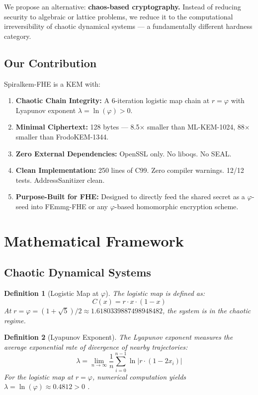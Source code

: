 \documentclass{article}
\newtheorem{definition}{Definition}[section]
\begin{document}
We propose an alternative: \textbf{chaos-based cryptography.} Instead of reducing security to algebraic or lattice problems, we reduce it to the computational irreversibility of chaotic dynamical systems — a fundamentally different hardness category.

\subsection{Our Contribution}

Spiralkem-FHE is a KEM with:
\begin{enumerate}
    \item \textbf{Chaotic Chain Integrity:} A 6-iteration logistic map chain at $r = \varphi$ with Lyapunov exponent $\lambda = \ln(\varphi) > 0$.
    \item \textbf{Minimal Ciphertext:} 128 bytes — 8.5$\times$ smaller than ML-KEM-1024, 88$\times$ smaller than FrodoKEM-1344.
    \item \textbf{Zero External Dependencies:} OpenSSL only. No liboqs. No SEAL.
    \item \textbf{Clean Implementation:} 250 lines of C99. Zero compiler warnings. 12/12 tests. AddressSanitizer clean.
    \item \textbf{Purpose-Built for FHE:} Designed to directly feed the shared secret as a $\varphi$-seed into FEmmg-FHE or any $\varphi$-based homomorphic encryption scheme.
\end{enumerate}

\section{Mathematical Framework}

\subsection{Chaotic Dynamical Systems}

\begin{definition}[Logistic Map at $\varphi$]
The logistic map is defined as:
\begin{equation}
C(x) = r \cdot x \cdot (1 - x)
\end{equation}
At $r = \varphi = (1+\sqrt{5})/2 \approx 1.6180339887498948482$, the system is in the chaotic regime.
\end{definition}

\begin{definition}[Lyapunov Exponent]
The Lyapunov exponent measures the average exponential rate of divergence of nearby trajectories:
\begin{equation}
\lambda = \lim_{n \to \infty} \frac{1}{n} \sum_{i=0}^{n-1} \ln |r \cdot (1 - 2x_i)|
\end{equation}
For the logistic map at $r = \varphi$, numerical computation yields $\lambda = \ln(\varphi) \approx 0.4812 > 0$ \cite{strogatz2018}.
\end{definition}
\end{document}
